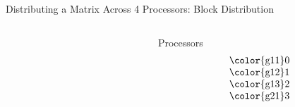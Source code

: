\begin{frame}
\begin{exampleblock}{Distributing a Matrix Across 4 Processors: Block Distribution}
\begin{columns}[t,onlytextwidth]
\begin{column}{0.5\textwidth}
\begin{align*}
      \end{align*}
    \end{column}
    \begin{column}{0.5\textwidth}
    \hfill Processors \hfill\ 
      \begin{align*}
      \begin{tabular}{l}
        \color{g11}0 \\
        \color{g12}1 \\
        \color{g13}2 \\
        \color{g21}3 
      \end{tabular}
      \end{align*}
    \end{column}
  \end{columns}
\end{exampleblock}
\end{frame}


